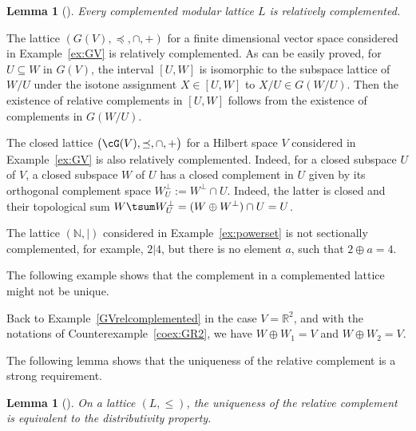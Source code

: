 \documentclass[pdftex]{sigma}
\numberwithin{equation}{section}
\newtheorem{Lemma}[Theorem]{Lemma}
\newcommand{\R}{\mathbb{R}}
\newcommand{\N}{\mathbb{N}}
\begin{document}
\begin{Lemma}[{\cite[Corollary to Theorem 11.1]{Ru}}] %
	 Every complemented modular lattice $L$ is relatively complemented.
\end{Lemma}

\begin{Example}\label{GVrelcomplemented}
The \subsp lattice $(G(V), \preceq, \cap, +)$ for a finite dimensional vector space considered in Example~\ref{ex:GV} is relatively complemented.
As can be easily proved, for $U\subseteq W$ in $G(V)$, the interval $[U, W]$ is isomorphic to the subspace lattice of $W/U$ under the isotone assignment $X\in [U,W]$ to $X/U\in G(W/U)$. Then the existence of relative complements in $[U,W]$ follows from the existence of complements in $G(W/U)$.
\end{Example}

\begin{Example}%
The closed \subsp lattice $\big(\cG(V), \preceq, \cap, +\big)$ for a Hilbert space $V$ considered in Example~\ref{ex:GV} is also relatively complemented. Indeed, for a closed subspace $U$ of $V$, a closed subspace $W$ of $U$ has a closed complement in $U$ given by its orthogonal complement space $W^\perp_U:=W^\perp\cap U$. Indeed, the latter is closed and their topological sum $W\tsum W^\perp_U=(W\oplus W^\perp)\cap U=U$.
\end{Example}

	\begin{coex}%
The lattice $(\N, \vert)$ considered in Example~\ref{ex:powerset} is not sectionally	complemented, for example, $2\vert 4$, but there is no element $a$, such that $2\oplus a=4$.	
\end{coex}
The following example shows that the complement in a complemented lattice might not be unique.

\begin{Example}%
Back to Example~\ref{GVrelcomplemented} in the case $V=\R^2$,
and with the notations of Counter\-example~\ref{coex:GR2}, we have $W\oplus W_1= V$ and $W\oplus W_2= V$.
\end{Example}
The following lemma shows that the uniqueness of the relative complement is a strong requi\-rement.

\begin{Lemma}[{\cite[Corollary 1, p.~134]{B}}] %
On a lattice $(L, \leq)$, the uniqueness of the relative complement is equivalent to the distributivity property.
\end{Lemma}
\end{document}
